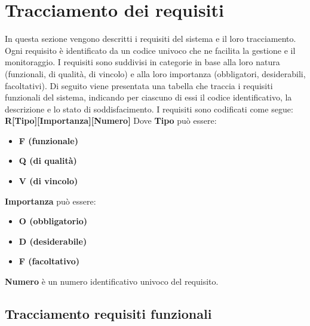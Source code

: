 \section{Tracciamento dei requisiti}
In questa sezione vengono descritti i requisiti del sistema e il loro tracciamento. Ogni requisito è identificato da un codice univoco che ne facilita la gestione e il monitoraggio. I requisiti sono suddivisi in categorie in base alla loro natura (funzionali, di qualità, di vincolo) e alla loro importanza
(obbligatori, desiderabili, facoltativi). Di seguito viene presentata una tabella che traccia i requisiti funzionali del sistema, indicando per ciascuno di essi il codice identificativo, la descrizione e lo stato di soddisfacimento.
\newline I requisiti sono codificati come segue: \textbf{R[Tipo][Importanza][Numero]}
\newline
Dove \textbf{Tipo} può essere:
\begin{itemize}
	\item \textbf{F (funzionale)}
	\item \textbf{Q (di qualità)}
	\item \textbf{V (di vincolo)}
\end{itemize}
\textbf{Importanza} può essere:
\begin{itemize}
	\item \textbf{O (obbligatorio)}
	\item \textbf{D (desiderabile)}
	\item \textbf{F (facoltativo)}
\end{itemize}
\textbf{Numero} è un numero identificativo univoco del requisito.
\newpage
\subsection{Tracciamento requisiti funzionali}

